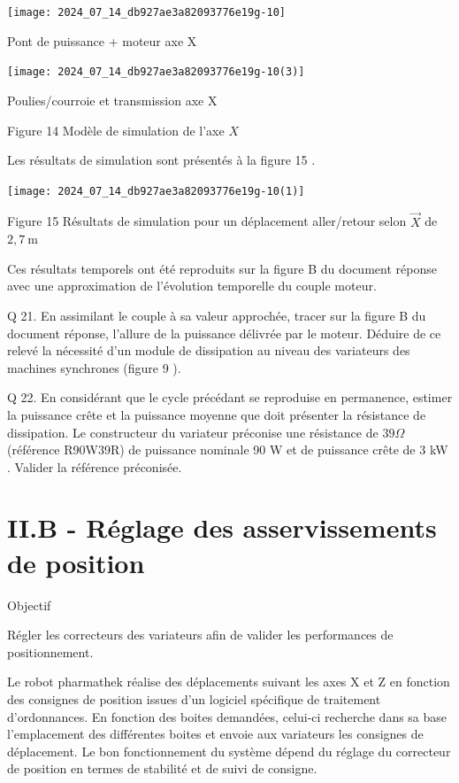 \documentclass[10pt]{article}
\begin{document}
\begin{center}
\texttt{[image: 2024\_07\_14\_db927ae3a82093776e19g-10]}
\end{center}

Pont de puissance + moteur axe X

\begin{center}
\texttt{[image: 2024\_07\_14\_db927ae3a82093776e19g-10(3)]}
\end{center}

Poulies/courroie et transmission axe X

Figure 14 Modèle de simulation de l'axe $X$

Les résultats de simulation sont présentés à la figure 15 .

\begin{center}
\texttt{[image: 2024\_07\_14\_db927ae3a82093776e19g-10(1)]}
\end{center}

Figure 15 Résultats de simulation pour un déplacement aller/retour selon $\vec{X}$ de $2,7 \mathrm{~m}$

Ces résultats temporels ont été reproduits sur la figure B du document réponse avec une approximation de l'évolution temporelle du couple moteur.

Q 21. En assimilant le couple à sa valeur approchée, tracer sur la figure B du document réponse, l'allure de la puissance délivrée par le moteur. Déduire de ce relevé la nécessité d'un module de dissipation au niveau des variateurs des machines synchrones (figure 9 ).

Q 22. En considérant que le cycle précédant se reproduise en permanence, estimer la puissance crête et la puissance moyenne que doit présenter la résistance de dissipation. Le constructeur du variateur préconise une résistance de $39 \Omega$ (référence R90W39R) de puissance nominale 90 W et de puissance crête de 3 kW . Valider la référence préconisée.

\section*{II.B - Réglage des asservissements de position}
Objectif

Régler les correcteurs des variateurs afin de valider les performances de positionnement.

Le robot pharmathek réalise des déplacements suivant les axes X et Z en fonction des consignes de position issues d'un logiciel spécifique de traitement d'ordonnances. En fonction des boites demandées, celui-ci recherche dans sa base l'emplacement des différentes boites et envoie aux variateurs les consignes de déplacement. Le bon fonctionnement du système dépend du réglage du correcteur de position en termes de stabilité et de suivi de consigne.
\end{document}
